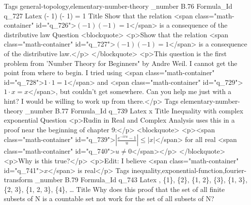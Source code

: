 Tags general-topology,elementary-number-theory
_number B.76
Formula_Id q_727
Latex (- 1) (- 1) = 1
Title Show that the relation <span class="math-container" id="q_726">$(- 1) (- 1) = 1$</span> is a consequence of the distributive law
Question <blockquote>   <p>Show that the relation <span class="math-container" id="q_727">$(- 1) (- 1) =  1$</span> is a consequence of the distributive law.</p> </blockquote>  <p>This question is the first problem from 'Number Theory for Beginners" by Andre Weil. I cannot get the point from where to begin. I tried using <span class="math-container" id="q_728">$1\cdot 1 = 1$</span> and <span class="math-container" id="q_729">$ 1\cdot x = x $</span>, but couldn't get somewhere. Can you help me just with a hint? I would be willing to work up from there.</p>
Tags elementary-number-theory
_number B.77
Formula_Id q_739
Latex \displaystyle \left {}\right\vert \le \vert x \vert
Title Inequality with complex exponential
Question <p>Rudin in Real and Complex Analysis uses this in a proof near the beginning of chapter 9:</p>  <blockquote>   <p><span class="math-container" id="q_739">$\displaystyle \left \vert{ \frac {e^{-ixu}-1}{u}}\right\vert \le \vert x \vert$</span> for all real <span class="math-container" id="q_740">$u \ne 0$</span></p> </blockquote>  <p>Why is this true?</p>  <p>Edit: I believe <span class="math-container" id="q_741">$x$</span> is real</p>
Tags inequality,exponential-function,fourier-transform
_number B.79
Formula_Id q_743
Latex \emptyset, \{1\}, \{2\}, \{1, 2\}, \{3\}, \{1, 3\}, \{2, 3\}, \{1, 2, 3\}, \{4\}, \ldots
Title Why does this proof that the set of all finite subsets of N is a countable set not work for the set of all subsets of N?
